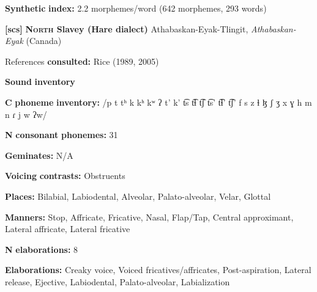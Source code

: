 \documentclass[output=paper]{langsci/langscibook}
\begin{document}
\begin{styleBody}
\textbf{Synthetic} \textbf{index:} 2.2 morphemes/word (642 morphemes, 293 words)
\end{styleBody}

\begin{styleBody}
\textbf{[scs]}   \textbf{\textsc{North} \textbf{Slavey} \textbf{(Hare} \textbf{dialect)}}  Athabaskan-Eyak-Tlingit, \textit{Athabaskan-Eyak} (Canada)
\end{styleBody}

\begin{styleBody}
References \textbf{consulted:} Rice (1989, 2005)
\end{styleBody}

\begin{styleBody}
\textbf{Sound} \textbf{inventory}
\end{styleBody}

\begin{styleBody}
\textbf{C} \textbf{phoneme} \textbf{inventory:} /p t tʰ k kʰ kʷ ʔ t’ k’ t͡s t͡ɬ t͡ʃ t͡s’ t͡ɬ’ t͡ʃ’ f s z ɬ ɮ ʃ ʒ x ɣ h m n ɾ j w ʔw/
\end{styleBody}

\begin{styleBody}
\textbf{N} \textbf{consonant} \textbf{phonemes:} 31
\end{styleBody}

\begin{styleBody}
\textbf{Geminates:} N/A
\end{styleBody}

\begin{styleBody}
\textbf{Voicing} \textbf{contrasts:} Obstruents
\end{styleBody}

\begin{styleBody}
\textbf{Places:} Bilabial, Labiodental, Alveolar, Palato-alveolar, Velar, Glottal
\end{styleBody}

\begin{styleBody}
\textbf{Manners:} Stop, Affricate, Fricative, Nasal, Flap/Tap, Central approximant, Lateral affricate, Lateral fricative
\end{styleBody}

\begin{styleBody}
\textbf{N} \textbf{elaborations:} 8
\end{styleBody}

\begin{styleBody}
\textbf{Elaborations:} Creaky voice, Voiced fricatives/affricates, Post-aspiration, Lateral release, Ejective, Labiodental, Palato-alveolar, Labialization
\end{styleBody}
\end{document}
